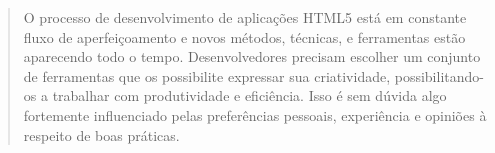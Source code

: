 

\cite{crossPlatformMobileGame}
\begin{quote}
O processo de desenvolvimento de aplicações HTML5 está em constante
fluxo de aperfeiçoamento e novos métodos, técnicas, e ferramentas
estão aparecendo todo o tempo. Desenvolvedores precisam escolher um
conjunto de ferramentas que os possibilite expressar sua criatividade,
possibilitando-os a trabalhar com produtividade e eficiência. Isso é
sem dúvida algo fortemente influenciado pelas preferências pessoais,
experiência e opiniões à respeito de boas práticas.
\end{quote}
